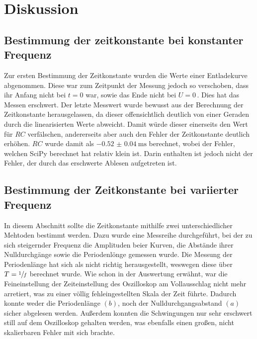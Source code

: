 \section{Diskussion}
\label{sec:Diskussion}
\subsection{Bestimmung der zeitkonstante bei konstanter Frequenz}
Zur ersten Bestimmung der Zeitkonstante wurden die Werte einer Entladekurve abgenommen.
Diese war zum Zeitpunkt der Messung jedoch so verschoben, dass ihr Anfang nicht bei $t=0$
war, sowie das Ende nicht bei $U=0$\,. Dies hat das Messen erschwert. Der letzte Messwert
wurde bewusst aus der Berechnung der Zeitkonstante herausgelassen, da dieser offensichtlich 
deutlich von einer Geraden durch die linearisierten Werte abweicht. Damit würde dieser einerseits
den Wert für $RC$ verfälschen, andererseits aber auch den Fehler der Zeitkonstante deutlich
erhöhen. $RC$ wurde damit als $\qty{-0,52(0.04)}{\milli\second}$ berechnet, wobei der Fehler,
welchen SciPy berechnet hat relativ klein ist. Darin enthalten ist jedoch nicht der Fehler, der 
durch das erschwerte Ablesen aufgetreten ist. 
\subsection{Bestimmung der Zeitkonstante bei variierter Frequenz}
In diesem Abschnitt sollte die Zeitkonstante mithilfe zwei unterschiedlicher Mehtoden bestimmt werden.
Dazu wurde eine Messreihe durchgeführt, bei der zu sich steigernder Frequenz die Amplituden beier Kurven,
die Abstände ihrer Nulldurchgänge sowie die Periodenlönge gemessen wurde. Die Messung der Periodenlänge 
hat sich als nicht richtig herausgestellt, weswegen diese über $T=\sfrac{1}{f}$ berechnet wurde.
Wie schon in der Auswertung erwähnt, war die Feineinstellung der Zeiteinstellung des Oszilloskop am 
Vollausschlag nicht mehr arretiert, was zu einer völlig fehleingestellten Skala der Zeit führte. Dadurch 
konnte weder die Periodenlänge $(b)$, noch der Nulldurchgangsabstand $(a)$ sicher abgelesen werden. 
Außerdem konnten die Schwingungen nur sehr erschwert still auf dem Oszilloskop gehalten werden, was
ebenfalls einen großen, nicht skalierbaren Fehler mit sich brachte. 